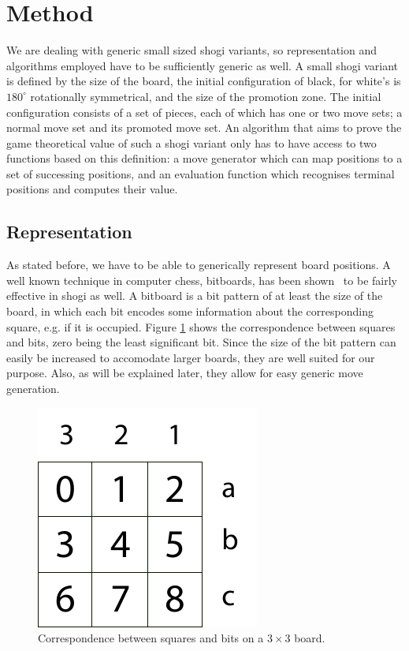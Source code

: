 \documentclass{article}
\begin{document}
\section{Method}
We are dealing with generic small sized shogi variants, so representation and algorithms employed have to be sufficiently generic as well.
A small shogi variant is defined by the size of the board, the initial configuration of black, for white's is $180^{\circ}$ rotationally symmetrical, and
the size of the promotion zone. The initial configuration consists of a set of pieces, each of which has one or two move sets; a normal move set and
its promoted move set. An algorithm that aims to prove the game theoretical value of such a shogi variant only has to have access to two functions based on this
definition: a move generator which can map positions to a set of successing positions, and an evaluation function which recognises terminal
positions and computes their value.

\subsection{Representation}
\label{sec:rep}
As stated before, we have to be able to generically represent board positions. A well known technique in computer chess, bitboards, has been
shown~\cite{grimbergen2007using} to be fairly effective in shogi as well. A bitboard is a bit pattern of at least the size of the board,
in which each bit encodes some information about the corresponding square, e.g. if it is occupied.
Figure \ref{bitsquares} shows the correspondence between squares and bits, zero being the least significant bit.
Since the size of the bit pattern can
easily be increased to accomodate larger boards, they are well suited for our purpose. Also, as will be explained later, they allow for easy
generic move generation.

\begin{figure}
\center
\includegraphics{bitsquares.pdf}
\caption{Correspondence between squares and bits on a $3 \times 3$ board.}
\label{bitsquares}
\end{figure}
\end{document}
